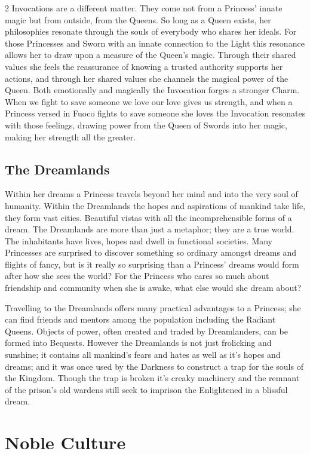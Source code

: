 \begin{multicols}{2}
Invocations are a different matter. They come not from a Princess' innate magic but from outside, from the Queens. So long as a Queen exists, her philosophies resonate through the souls of everybody who shares her ideals. For those Princesses and Sworn with an innate connection to the Light this resonance allows her to draw upon a measure of the Queen's magic. Through their shared values she feels the reassurance of knowing a trusted authority supports her actions, and through her shared values she channels the magical power of the Queen. Both emotionally and magically the Invocation forges a stronger Charm. When we fight to save someone we love our love gives us strength, and when a Princess versed in Fuoco fights to save someone she loves the Invocation resonates with those feelings, drawing power from the Queen of Swords into her magic, making her strength all the greater.

\subsection*{The Dreamlands}

Within her dreams a Princess travels beyond her mind and into the very soul of humanity. Within the Dreamlands the hopes and aspirations of mankind take life, they form vast cities. Beautiful vistas with all the incomprehensible forms of a dream. The Dreamlands are more than just a metaphor; they are a true world. The inhabitants have lives, hopes and dwell in functional societies. Many Princesses are surprised to discover something so ordinary amongst dreams and flights of fancy, but is it really so surprising than a Princess' dreams would form after how she sees the world? For the Princess who cares so much about friendship and community when she is awake, what else would she dream about? 

Travelling to the Dreamlands offers many practical advantages to a Princess; she can find friends and mentors among the population including the Radiant Queens. Objects of power, often created and traded by Dreamlanders, can be formed into Bequests. However the Dreamlands is not just frolicking and sunshine; it contains all mankind's fears and hates as well as it's hopes and dreams; and it was once used by the Darkness to construct a trap for the souls of the Kingdom. Though the trap is broken it's creaky machinery and the remnant of the prison's old wardens still seek to imprison the Enlightened in a blissful dream. 

\section*{Noble Culture}
\label{sec:NobleCulture}


\end{multicols}
